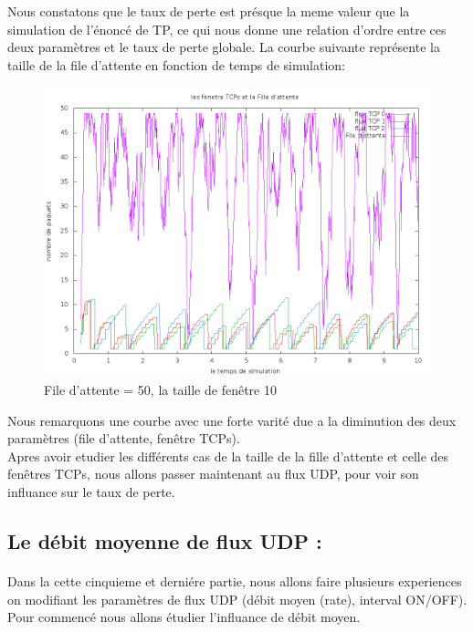 \documentclass[a4paper]{report}
\theoremstyle{definition}
\begin{document}
Nous constatons que le taux de perte est présque la meme valeur que la simulation de l'énoncé de TP, ce qui nous donne une relation d'ordre entre ces deux paramètres et le taux de perte globale. 
	La courbe suivante représente la taille de la file d'attente en fonction de temps de simulation: 
\begin{figure}[h]
	\centering
		\includegraphics[width=450px]{graphic/f50w10.png}
		\caption{File d'attente = 50, la taille de fenêtre 10}
\end{figure}
Nous remarquons une courbe avec une forte varité due a la diminution des deux paramètres (file d'attente, fenêtre TCPs).\\
Apres avoir etudier les différents cas de la taille de la fille d'attente et celle des fenêtres TCPs, nous allons passer maintenant au flux UDP, pour voir son influance sur le taux de perte.

\newpage

\subsection*{Le débit moyenne de flux UDP :}
\paragraph{}
    Dans la cette cinquieme et derniére partie, nous allons faire plusieurs experiences on modifiant les paramètres de flux UDP (débit moyen (rate), interval ON/OFF).
    Pour commencé nous allons étudier l'influance de débit moyen. 
	
\end{document}
